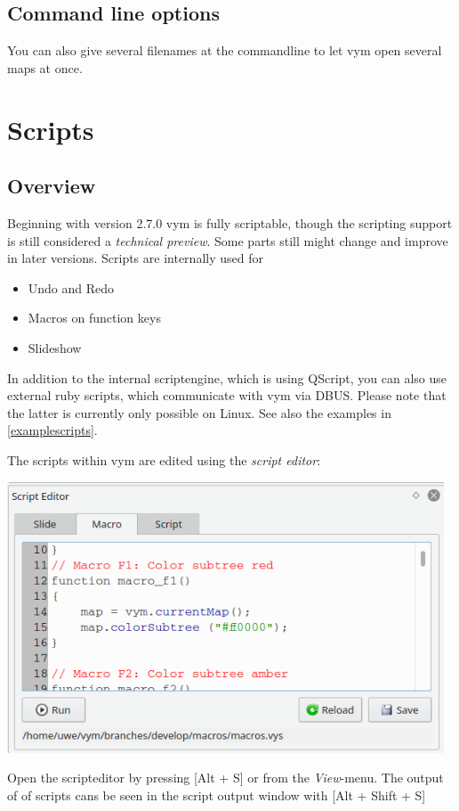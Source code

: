\documentclass[12pt,a4paper]{article}
\newcommand{\vym}{{\sc vym }}
\newcommand{\key}[1]{[#1]}
\begin{document}
\begin{appendix}
\subsection{Command line options} \label{options} 

You can also give several filenames at the commandline to let \vym open
several maps at once.
 

\section{Scripts} \label{scripts}   
\subsection{Overview}
Beginning with version 2.7.0 \vym is fully scriptable, though the
scripting support is still considered a {\em technical preview}. Some
parts still might change and improve in later versions.
Scripts are internally used for
\begin{itemize}
    \item Undo and Redo
    \item Macros on function keys
    \item Slideshow
\end{itemize}
In addition to the internal scriptengine, which is using QScript, 
you can also  use external ruby scripts, which communicate with \vym via
DBUS. Please note that the latter is currently only possible on Linux.
See also the examples in \ref{examplescripts}.

The scripts within \vym are edited using the {\em script editor}:
\begin{center} \label{scripteditor}
    \includegraphics[width=13cm]{images/scripteditor.png}
\end{center}
Open the scripteditor by pressing \key{Alt + S} or from the {\em
View}-menu. The output of of scripts cans be seen in the script output
window with \key{Alt + Shift + S}


\end{appendix}
\end{document}

